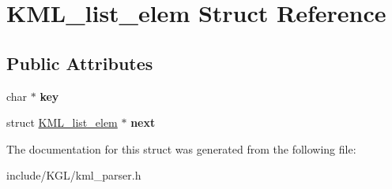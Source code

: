 \hypertarget{struct_k_m_l__list__elem}{}\section{K\+M\+L\+\_\+list\+\_\+elem Struct Reference}
\label{struct_k_m_l__list__elem}
\subsection*{Public Attributes}
\begin{DoxyCompactItemize}
\item 
\mbox{\label{struct_k_m_l__list__elem_a00c4725ca5d75eb0cbccdbd314cf6365}} 
char $\ast$ {\bfseries key}
\item 
\mbox{\label{struct_k_m_l__list__elem_a0d548f3c0aa65a0cb3ec2441ad00a809}} 
struct \mbox{\hyperlink{struct_k_m_l__list__elem}{K\+M\+L\+\_\+list\+\_\+elem}} $\ast$ {\bfseries next}
\end{DoxyCompactItemize}


The documentation for this struct was generated from the following file\+:\begin{DoxyCompactItemize}
\item 
include/\+K\+G\+L/kml\+\_\+parser.\+h\end{DoxyCompactItemize}
